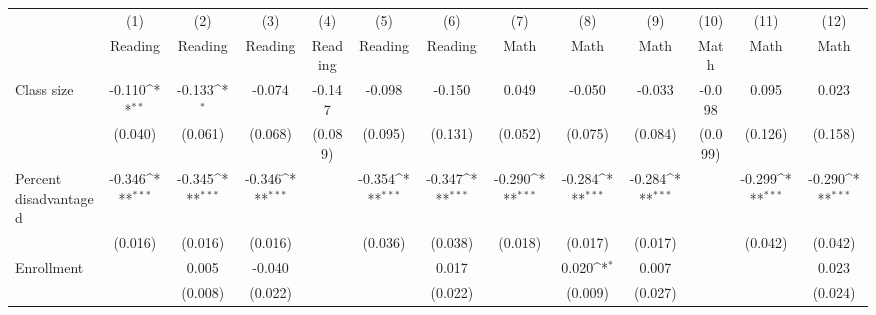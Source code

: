 {
\def\sym#1{\ifmmode^{#1}\else\(^{#1}\)\fi}
\begin{tabular}{l*{12}{c}}
\toprule
            &\multicolumn{1}{c}{(1)}&\multicolumn{1}{c}{(2)}&\multicolumn{1}{c}{(3)}&\multicolumn{1}{c}{(4)}&\multicolumn{1}{c}{(5)}&\multicolumn{1}{c}{(6)}&\multicolumn{1}{c}{(7)}&\multicolumn{1}{c}{(8)}&\multicolumn{1}{c}{(9)}&\multicolumn{1}{c}{(10)}&\multicolumn{1}{c}{(11)}&\multicolumn{1}{c}{(12)}\\
            &\multicolumn{1}{c}{Reading}&\multicolumn{1}{c}{Reading}&\multicolumn{1}{c}{Reading}&\multicolumn{1}{c}{Reading}&\multicolumn{1}{c}{Reading}&\multicolumn{1}{c}{Reading}&\multicolumn{1}{c}{Math}&\multicolumn{1}{c}{Math}&\multicolumn{1}{c}{Math}&\multicolumn{1}{c}{Math}&\multicolumn{1}{c}{Math}&\multicolumn{1}{c}{Math}\\
\midrule
Class size  &      -0.110\sym{**} &      -0.133\sym{*}  &      -0.074         &      -0.147         &      -0.098         &      -0.150         &       0.049         &      -0.050         &      -0.033         &      -0.098         &       0.095         &       0.023         \\
            &     (0.040)         &     (0.061)         &     (0.068)         &     (0.089)         &     (0.095)         &     (0.131)         &     (0.052)         &     (0.075)         &     (0.084)         &     (0.099)         &     (0.126)         &     (0.158)         \\
\addlinespace
Percent disadvantaged&      -0.346\sym{***}&      -0.345\sym{***}&      -0.346\sym{***}&                     &      -0.354\sym{***}&      -0.347\sym{***}&      -0.290\sym{***}&      -0.284\sym{***}&      -0.284\sym{***}&                     &      -0.299\sym{***}&      -0.290\sym{***}\\
            &     (0.016)         &     (0.016)         &     (0.016)         &                     &     (0.036)         &     (0.038)         &     (0.018)         &     (0.017)         &     (0.017)         &                     &     (0.042)         &     (0.042)         \\
\addlinespace
Enrollment  &                     &       0.005         &      -0.040         &                     &                     &       0.017         &                     &       0.020\sym{*}  &       0.007         &                     &                     &       0.023         \\
            &                     &     (0.008)         &     (0.022)         &                     &                     &     (0.022)         &                     &     (0.009)         &     (0.027)         &                     &                     &     (0.024)         \\

\end{tabular}}
